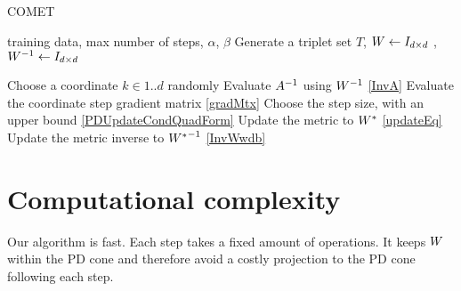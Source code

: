 \documentclass{article}
\begin{document}
\begin{algorithm}[tb]
   \caption{COMET}
   \label{alg:comet}
\begin{algorithmic}[1]
    training data, max number of steps, $\alpha$, $\beta$
   \STATE Generate a triplet set $T$, ${W}  \leftarrow I_{d \times d}$ , ${W}^{-1}  \leftarrow I_{d \times d}$

   \REPEAT 
   \STATE Choose a coordinate $k \in {1..d}$ randomly
   \STATE Evaluate ${A}^{-1}$ using ${W}^{-1}$ \eqref{InvA}
   \STATE Evaluate the coordinate step gradient matrix \eqref{gradMtx}
   \STATE Choose the step size, with an upper bound  \eqref{PDUpdateCondQuadForm}
   \STATE Update the metric to ${{W^*}}$ \eqref{updateEq}
   \STATE Update the metric inverse to ${{W^*}}^{-1}$ \eqref{InvWwdb}
\end{algorithmic}
\end{algorithm}

\section{Computational complexity}
Our algorithm is fast. Each step takes a fixed amount of operations. It keeps ${W}$ within the PD cone and therefore avoid a costly projection to the PD cone following each step. 

\end{document}

